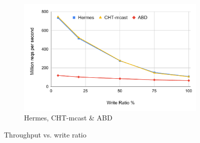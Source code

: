 \begin{figure}[t]
\begin{subfigure}[t]{0.33\textwidth}
    \includegraphics[width=\textwidth]{1_figures/hr-chtm-abd.pdf}
    \captionsetup{width=0.90\linewidth}
    \caption{Hermes, CHT-mcast \& ABD}
  \label{fig:hr-cht-abd}
  \end{subfigure}
  \caption{Throughput vs. write ratio}
  \label{fig:three-graphs}
\end{figure}

